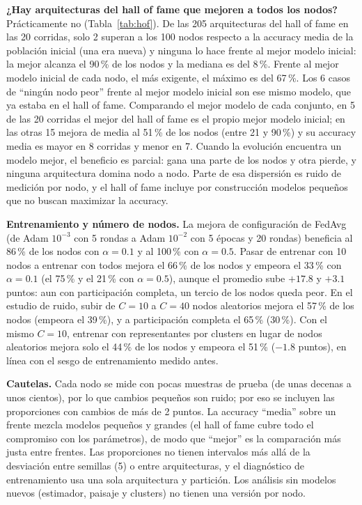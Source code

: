 \documentclass[11pt,a4paper]{article}
\begin{document}
\textbf{¿Hay arquitecturas del hall of fame que mejoren a todos los nodos?} Prácticamente no (Tabla~\ref{tab:hof}). De las 205 arquitecturas del hall of fame en las 20 corridas, solo 2 superan a los 100 nodos respecto a la accuracy media de la población inicial (una era nueva) y ninguna lo hace frente al mejor modelo inicial: la mejor alcanza el 90\,\% de los nodos y la mediana es del 8\,\%. Frente al mejor modelo inicial de cada nodo, el más exigente, el máximo es del 67\,\%. Los 6 casos de ``ningún nodo peor'' frente al mejor modelo inicial son ese mismo modelo, que ya estaba en el hall of fame. Comparando el mejor modelo de cada conjunto, en 5 de las 20 corridas el mejor del hall of fame es el propio mejor modelo inicial; en las otras 15 mejora de media al 51\,\% de los nodos (entre 21 y 90\,\%) y su accuracy media es mayor en 8 corridas y menor en 7. Cuando la evolución encuentra un modelo mejor, el beneficio es parcial: gana una parte de los nodos y otra pierde, y ninguna arquitectura domina nodo a nodo. Parte de esa dispersión es ruido de medición por nodo, y el hall of fame incluye por construcción modelos pequeños que no buscan maximizar la accuracy.


\textbf{Entrenamiento y número de nodos.} La mejora de configuración de FedAvg (de Adam $10^{-3}$ con 5 rondas a Adam $10^{-2}$ con 5 épocas y 20 rondas) beneficia al 86\,\% de los nodos con $\alpha=0.1$ y al 100\,\% con $\alpha=0.5$. Pasar de entrenar con 10 nodos a entrenar con todos mejora el 66\,\% de los nodos y empeora el 33\,\% con $\alpha=0.1$ (el 75\,\% y el 21\,\% con $\alpha=0.5$), aunque el promedio sube $+17.8$ y $+3.1$ puntos: aun con participación completa, un tercio de los nodos queda peor. En el estudio de ruido, subir de $C=10$ a $C=40$ nodos aleatorios mejora el 57\,\% de los nodos (empeora el 39\,\%), y a participación completa el 65\,\% (30\,\%). Con el mismo $C=10$, entrenar con representantes por clusters en lugar de nodos aleatorios mejora solo el 44\,\% de los nodos y empeora el 51\,\% ($-1.8$ puntos), en línea con el sesgo de entrenamiento medido antes.

\textbf{Cautelas.} Cada nodo se mide con pocas muestras de prueba (de unas decenas a unos cientos), por lo que cambios pequeños son ruido; por eso se incluyen las proporciones con cambios de más de 2 puntos. La accuracy ``media'' sobre un frente mezcla modelos pequeños y grandes (el hall of fame cubre todo el compromiso con los parámetros), de modo que ``mejor'' es la comparación más justa entre frentes. Las proporciones no tienen intervalos más allá de la desviación entre semillas (5) o entre arquitecturas, y el diagnóstico de entrenamiento usa una sola arquitectura y partición. Los análisis sin modelos nuevos (estimador, paisaje y clusters) no tienen una versión por nodo.
\end{document}
